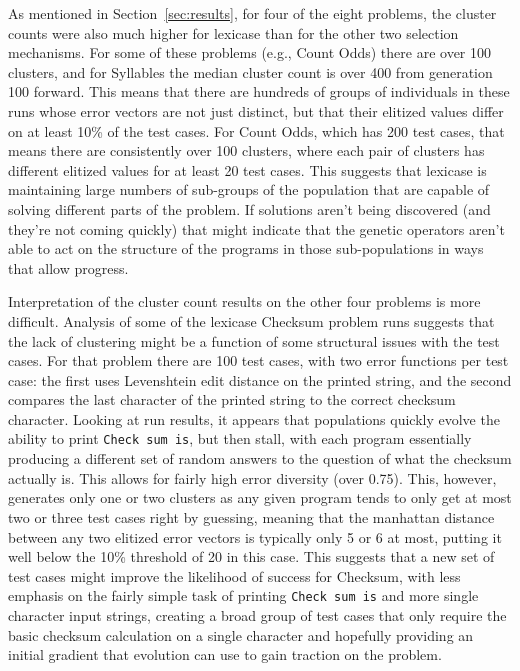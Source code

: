 As mentioned in Section~\ref{sec:results}, for four of the eight problems, the cluster counts were
also much higher for lexicase than for the other two selection mechanisms. For some of these problems
(e.g., Count Odds) there are over 100 clusters, and for Syllables the median cluster count is over 400
from generation 100 forward. This means that there are hundreds of groups of individuals in these runs
whose error vectors are not just distinct, but that their elitized values differ on at least 10\%
of the test cases. For Count Odds, which has 200 test cases, that means there are consistently over
100 clusters, where each pair of clusters has different elitized values for at least 20 test cases.
This suggests that lexicase is maintaining large numbers of sub-groups of the population that are 
capable of solving different parts of the problem. If solutions aren't being discovered (and they're
not coming quickly) that might indicate that the genetic operators aren't able to act on the structure 
of the programs in those sub-populations in ways that allow progress.

Interpretation of the cluster count results on the other four problems is more difficult. Analysis
of some of the lexicase Checksum problem runs suggests that the lack of clustering might be a function
of some structural issues with the test cases.
For that problem there are 100 test cases, with two error functions per test case: the first uses Levenshtein edit distance on the printed string, and the second compares the last character of the printed string to the correct checksum character.
Looking at run
results, it appears that populations quickly evolve the ability to print \texttt{Check sum is}, but
then stall, with each program essentially producing a different set of random answers to the question
of what the checksum actually is. This allows for fairly high error diversity (over 0.75). This, however,
generates only one or two clusters as any given program tends to only get at most two or three test 
cases right by guessing, meaning that the manhattan distance between any two elitized error vectors
is typically only 5 or 6 at most, putting it well below the 10\% threshold of 20 in this case. This
suggests that a new set of test cases might improve the likelihood of success for Checksum, with
less emphasis on the fairly simple task of printing \texttt{Check sum is} and more single character
input strings, creating a broad group of test cases that only require the basic checksum calculation
on a single character and hopefully providing an initial gradient that evolution can use to gain
traction on the problem.

